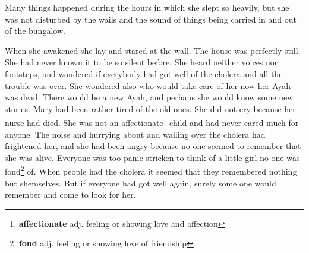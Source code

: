 Many things happened during the hours in which she slept so heavily, but she was not disturbed by the wails and the sound of things being carried in and out of the bungalow.

When she awakened she lay and stared at the wall. The house was perfectly still. She had never known it to be so silent before. She heard neither voices nor footsteps, and wondered if everybody had got well of the cholera and all the trouble was over. She wondered also who would take care of her now her Ayah was dead. There would be a new Ayah, and perhaps she would know some new stories. Mary had been rather tired of the old ones. She did not cry because her nurse had died. She was not an affectionate\footnote{\textbf{affectionate} adj. feeling or showing love and affection} child and had never cared much for anyone. The noise and hurrying about and wailing over the cholera had frightened her, and she had been angry because no one seemed to remember that she was alive. Everyone was too panic-stricken to think of a little girl no one was fond\footnote{\textbf{fond} adj. feeling or showing love of friendship} of. When people had the cholera it seemed that they remembered nothing but shemselves. But if everyone had got well again, surely some one would remember and come to look for her.

